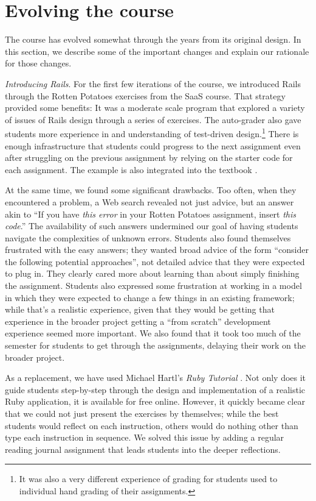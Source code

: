 \section{Evolving the course}

The course has evolved somewhat through the years from its original
design.  In this section, we describe some of the important changes
and explain our rationale for those changes.

\textit{Introducing Rails}.  For the first few iterations of the
course, we introduced Rails through the Rotten Potatoes exercises
from the SaaS course.  That strategy provided some benefits: It was
a moderate scale program that explored a variety of issues of Rails
design through a series of exercises.  The auto-grader also gave
students more experience in and understanding of test-driven
design.\footnote{It was also a very different experience of grading
for students used to individual hand grading of their assignments.}
There is enough infrastructure that students could progress to the
next assignment even after struggling on the previous assignment
by relying on the starter code for each assignment.  The example
is also integrated into the textbook \cite{saasbook}.

At the same time, we found some significant drawbacks.  Too often,
when they encountered a problem, a Web search revealed not just
advice, but an answer akin to ``If you have \textit{this error} in
your Rotten Potatoes assignment, insert \textit{this code}.''  The
availability of such answers undermined our goal of having students
navigate the complexities of unknown errors.  Students also found
themselves frustrated with the easy answers; they wanted broad
advice of the form ``consider the following potential approaches'',
not detailed advice that they were expected to plug in.  They clearly
cared more about learning than about simply finishing the assignment.
Students also expressed some frustration at working in a model in
which they were expected to change a few things in an existing
framework; while that's a realistic experience, given that they
would be getting that experience in the broader project getting a
``from scratch'' development experience seemed more important.
We also found that it took too much of the semester for students 
to get through the assignments, delaying their work on the broader
project.

As a replacement, we have used Michael Hartl's \textit{Ruby Tutorial}
\cite{ruby-tutorial}.  Not only does it guide students step-by-step
through the design and implementation of a realistic Ruby application,
it is available for free online.  However, it quickly became clear
that we could not just present the exercises by themselves; while the 
best students would reflect on each instruction, others would do nothing
other than type each instruction in sequence.  We solved this issue by
adding a regular reading journal assignment that leads students into the
deeper reflections.

